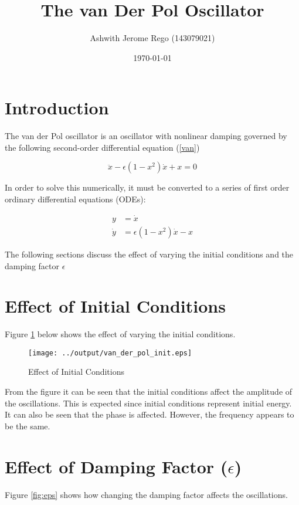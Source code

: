 \documentclass[12pt]{article}
\title{The van Der Pol Oscillator}
\author{Ashwith Jerome Rego (143079021)}
\date{\today}
\begin{document}
\maketitle

\section{Introduction}
The van der Pol oscillator is an oscillator with nonlinear damping
governed by the following second-order differential equation
(\ref{van})
\cite{scholar}

\begin{equation}
\ddot{x} - \epsilon \left(1 - x^2\right)\dot{x} + x = 0
\label{van}
\end{equation}

In order to solve this numerically, it must be converted to a series
of first order ordinary differential equations (ODEs):

\begin{align}
y &= \dot{x}\\
\dot{y} &= \epsilon \left(1 - x^2\right)\dot{x} - x 
\end{align}

The following sections discuss the effect of varying the initial
conditions and the damping factor $\epsilon$


\section{Effect of Initial Conditions}

Figure \ref{fig:init} below shows the effect of varying the initial
conditions.

\begin{figure}[H]
  \centering
  \texttt{[image: ../output/van\_der\_pol\_init.eps]}
  \caption{Effect of Initial Conditions}
  \label{fig:init}
\end{figure}

From the figure it can be seen that the initial conditions affect the
amplitude of the oscillations. This is expected since initial
conditions represent initial energy. It can also be seen that the
phase is affected. However, the frequency appears to be the same.

\section{Effect of Damping Factor ($\epsilon$)}

Figure \ref{fig:eps} shows how changing the damping factor affects
the oscillations.
\end{document}
